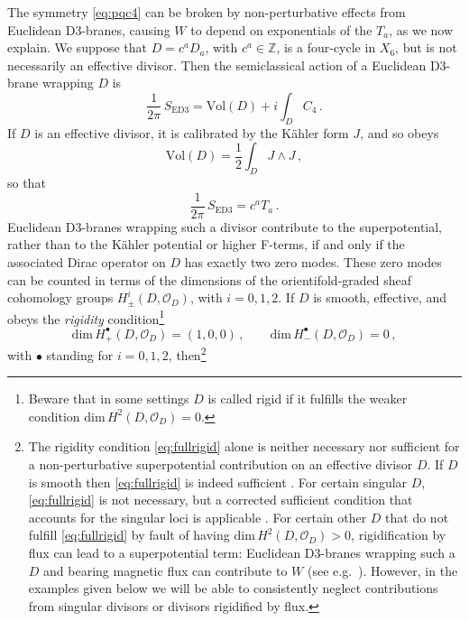 \documentclass[12pt,a4wide]{article}
\begin{document}
The symmetry \eqref{eq:pqc4} can be broken by non-perturbative effects from Euclidean D3-branes, causing $W$ to depend on exponentials of the $T_a$, as we now explain.
We suppose that $D = c^a D_a$, with $c^a \in \mathbb{Z}$, is 
a four-cycle in $X_6$, but is not necessarily an effective divisor.
Then the semiclassical action of a Euclidean D3-brane wrapping $D$ is 
\begin{equation}\label{eq:sed3}
    \frac{1}{2\pi}\,S_{\text{ED3}} = \text{Vol}(D) + i \int_{D} C_4\,.
\end{equation}  
If $D$ is an effective divisor, it is calibrated by the K\"ahler form $J$, and so obeys 
\begin{equation}
\text{Vol}(D)=\frac{1}{2}\int_{D}  J \wedge J\,,   
\end{equation} so that 
\begin{equation}\label{eq:sed3eff}
    \frac{1}{2\pi}\,S_{\text{ED3}} =c^a T_a\,.
\end{equation}  
Euclidean D3-branes wrapping such a divisor contribute to the superpotential, rather than to the K\"ahler potential or higher F-terms, if and only if the associated Dirac operator on $D$ has exactly two zero modes.  These zero modes can be counted in terms of the dimensions of the orientifold-graded sheaf cohomology groups $H^{i}_{\pm}(D,\mathcal{O}_D)$, with $i = 0, 1, 2$.
If $D$ is smooth, effective, and obeys the \emph{rigidity} condition\footnote{Beware that in some settings $D$ is called rigid if it fulfills the weaker condition $\text{dim}\, H^{2}(D,\mathcal{O}_D) = 0$.}  
\begin{equation}\label{eq:fullrigid}
    \text{dim}\, H^{\bullet}_+(D,\mathcal{O}_D) = (1,0,0)\,, \qquad \text{dim}\, H^{\bullet}_-(D,\mathcal{O}_D) = 0\,,
\end{equation} with $\bullet$ standing for $i=0,1,2$, 
then\footnote{The rigidity condition \eqref{eq:fullrigid} alone is neither necessary nor sufficient for a non-perturbative superpotential contribution on an effective divisor $D$.  If $D$ is smooth then \eqref{eq:fullrigid} is indeed sufficient \cite{Witten:1996bn}.
For certain singular $D$, \eqref{eq:fullrigid} is not necessary, but a corrected sufficient condition that accounts for the singular loci is applicable \cite{Gendler:2022qof}.  For certain other $D$ that do not fulfill \eqref{eq:fullrigid} by fault of having $\text{dim}\, H^{2}(D,\mathcal{O}_D)>0$, rigidification by flux can lead to a superpotential term: Euclidean D3-branes wrapping such a $D$ and bearing magnetic flux can contribute to $W$
(see e.g.~\cite{Grimm:2011dj,Bianchi:2011qh,Bianchi:2012pn,Bianchi:2012kt}).  However, in the examples given below we will be able to consistently neglect contributions from singular divisors or divisors rigidified by flux.}
\end{document}
